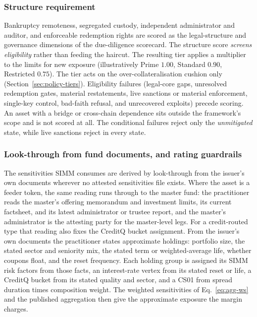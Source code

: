\subsubsection{Structure requirement}
Bankruptcy remoteness, segregated custody, independent administrator and auditor, and enforceable redemption rights are scored as the legal-structure and governance dimensions of the due-diligence scorecard. The structure score \emph{screens eligibility} rather than feeding the haircut. The resulting tier applies a multiplier to the limits for new exposure (illustratively Prime $1.00$, Standard $0.90$, Restricted $0.75$). The tier acts on the over-collateralisation cushion only (Section~\ref{sec:policy-tiers}). Eligibility failures (legal-core gaps, unresolved redemption gates, material restatements, live sanctions or material enforcement, single-key control, bad-faith refusal, and unrecovered exploits) precede scoring. An asset with a bridge or cross-chain dependence sits outside the framework's scope and is not scored at all. The conditional failures reject only the \emph{unmitigated} state, while live sanctions reject in every state.

\subsubsection{Look-through from fund documents, and rating guardrails}\label{sec:tax-lookthrough}
The sensitivities SIMM consumes are derived by look-through from the issuer's own documents wherever no attested sensitivities file exists. Where the asset is a feeder token, the same reading runs through to the master fund: the practitioner reads the master's offering memorandum and investment limits, its current factsheet, and its latest administrator or trustee report, and the master's administrator is the attesting party for the master-level legs. For a credit-routed type that reading also fixes the CreditQ bucket assignment. From the issuer's own documents the practitioner states approximate holdings: portfolio size, the stated sector and seniority mix, the stated term or weighted-average life, whether coupons float, and the reset frequency. Each holding group is assigned its SIMM risk factors from those facts, an interest-rate vertex from its stated reset or life, a CreditQ bucket from its stated quality and sector, and a CS01 from spread duration times composition weight. The weighted sensitivities of Eq.~\eqref{eq:agg-ws} and the published aggregation then give the approximate exposure the margin charges.

